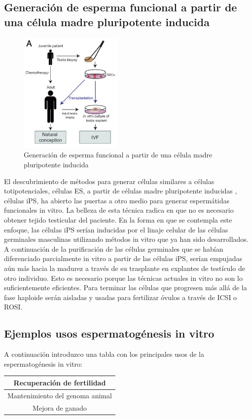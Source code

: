 \documentclass[a4paper,11pt]{article}
\begin{document}
\subsection{Generación de esperma funcional a partir de una célula madre pluripotente inducida}
\begin{figure}[htb!] 
    \caption{Generación de esperma funcional a partir de una célula madre pluripotente inducida}
    \centering 
    \includegraphics[width=5cm]{Cancer-prepuber.jpg}
\end{figure}
El descubrimiento de métodos para generar células similares a células totipotenciales, células ES, a partir de células madre pluripotente inducidas , células iPS, ha abierto las puertas a otro medio para generar espermátidas funcionales in vitro. La belleza de esta técnica radica en que no es necesario obtener tejido testicular del paciente. En la forma en que se contempla este enfoque, las células iPS serían inducidas por el linaje celular de las células germinales masculinas utilizando métodos in vitro que ya han sido desarrollados. 
A continuación de la purificación de las células germinales que se habían diferenciado parcialmente in vitro a partir de las células iPS, serían empujadas aún más hacia la madurez a través de su trasplante en explantes de testículo de otro individuo. Esto es necesario porque las técnicas actuales in vitro no son lo suficientemente eficientes. Para terminar las células que progresen más allá de la fase haploide serán aisladas y usadas para fertilizar óvulos a través de ICSI o ROSI.
\subsection{Ejemplos usos espermatogénesis in vitro}
A continuación introduzco una tabla con los principales usos de la espermatogénesis in vitro:\
\begin{table}[h!]
\begin{tabular}{|c|}
\hline
Recuperación de fertilidad \\
\hline
Mantenimiento del genoma animal \\
\hline
Mejora de ganado \\
\hline
\end{tabular}
\end{table}
\end{document}
